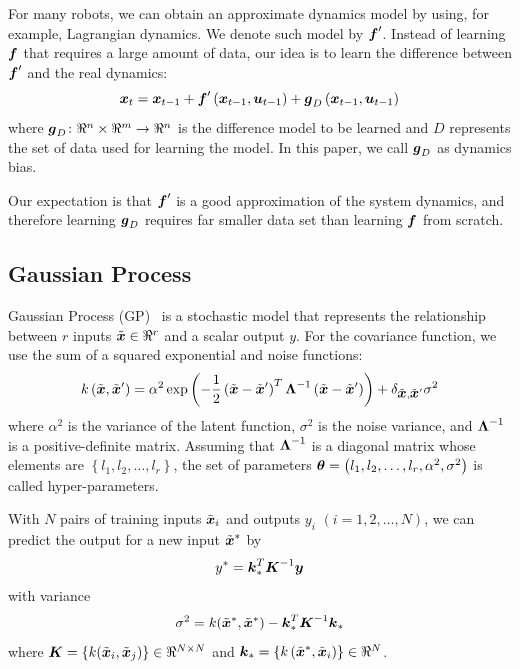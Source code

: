 \documentclass[letterpaper, 10 pt, conference]{ieeeconf}
\begin{document}
For many robots, we can obtain an approximate dynamics model by using,
for example, Lagrangian dynamics.
We denote such model by $\mbox{\boldmath \(f\)}'$.
Instead of learning $\mbox{\boldmath \(f\)}$ that requires a large amount of data,
our idea is to learn the difference between $\mbox{\boldmath \(f\)}'$ and the real
dynamics:
\begin{equation}
\mbox{\boldmath \(x\)}_t = \mbox{\boldmath \(x\)}_{t-1} + \mbox{\boldmath \(f\)}'\left(\mbox{\boldmath \(x\)}_{t-1},
\mbox{\boldmath \(u\)}_{t-1}\right) +
\mbox{\boldmath \(g\)}_D\left(\mbox{\boldmath \(x\)}_{t-1},\mbox{\boldmath \(u\)}_{t-1}\right)
\end{equation}
where $\mbox{\boldmath \(g\)}_D\colon
\Re^{n}\times\Re^{m}\rightarrow\Re^{n}$ is the difference
model to be learned and $D$ 
represents the set of data used for learning the model.
In this paper, we call $\mbox{\boldmath \(g\)}_D$ as dynamics bias.

Our expectation is that $\mbox{\boldmath \(f\)}'$ is a good approximation of the system
dynamics, and therefore learning $\mbox{\boldmath \(g\)}_D$ requires far smaller
data set than learning $\mbox{\boldmath \(f\)}$ from scratch.

\subsection{Gaussian Process}


Gaussian Process (GP)~\cite{bib-rasmussen-gp} is a stochastic model that
represents the relationship between $r$ inputs
$\tilde{\mbox{\boldmath \(x\)}}\in \Re^{r}$ and a scalar output $y$.
For the covariance function, we use the sum of a squared exponential
and noise functions:
\begin{equation}
k\left(\tilde{\mbox{\boldmath \(x\)}}, \tilde{\mbox{\boldmath \(x\)}}'\right) = \alpha^2 \exp \left(
-\frac{1}{2} \left(\tilde{\mbox{\boldmath \(x\)}} - \tilde{\mbox{\boldmath \(x\)}}'\right)^T
\mbox{\boldmath \(\Lambda\)}^{-1} \left(\tilde{\mbox{\boldmath \(x\)}} - \tilde{\mbox{\boldmath \(x\)}}'\right)
\right)
+ \delta_{\tilde{\mbox{\boldmath \(x\)}}, \tilde{\mbox{\boldmath \(x\)}}'} \sigma^2
\end{equation}
where $\alpha^2$ is the variance of the latent function, $\sigma^2$ is
the noise variance, and $\mbox{\boldmath \(\Lambda\)}^{-1}$ is a positive-definite
matrix. 
Assuming that $\mbox{\boldmath \(\Lambda\)}^{-1}$ is a diagonal matrix whose
elements are $\left\{l_1, l_2, \ldots, l_r\right\}$, the set of
parameters $\mbox{\boldmath \(\theta\)} =
\left(l_1,l_2,\ldots,l_r,\alpha^2,\sigma^2\right)$ is called
hyper-parameters. 

With $N$ pairs of training inputs $\tilde{\mbox{\boldmath \(x\)}}_i$ and outputs
$y_i$ $(i=1,2,\ldots,N)$, we can predict the output for a new
input $\tilde{\mbox{\boldmath \(x\)}}^*$ by
\begin{equation}
y^* = \mbox{\boldmath \(k\)}_*^T \mbox{\boldmath \(K\)}^{-1} \mbox{\boldmath \(y\)}
\end{equation}
with variance
\begin{equation}
\sigma^2 = k(\tilde{\mbox{\boldmath \(x\)}}^*, \tilde{\mbox{\boldmath \(x\)}}^*) -
\mbox{\boldmath \(k\)}_*^{T} \mbox{\boldmath \(K\)}^{-1} \mbox{\boldmath \(k\)}_*
\end{equation}
where $\mbox{\boldmath \(K\)} = \left\{ k(\tilde{\mbox{\boldmath \(x\)}}_i,
\tilde{\mbox{\boldmath \(x\)}}_j)\right\} \in\Re^{N\times N}$ and 
$\mbox{\boldmath \(k\)}_* = \left\{
k\left(\tilde{\mbox{\boldmath \(x\)}}^*,\tilde{\mbox{\boldmath \(x\)}}_i\right)\right\} 
\in \Re^{N}$.
\end{document}
